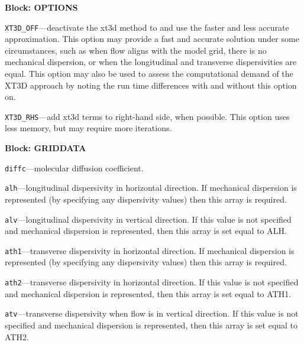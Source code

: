 
\item \textbf{Block: OPTIONS}

\begin{description}
\item \texttt{XT3D\_OFF}---deactivate the xt3d method to and use the faster and less accurate approximation.  This option may provide a fast and accurate solution under some circumstances, such as when flow aligns with the model grid, there is no mechanical dispersion, or when the longitudinal and transverse dispersivities are equal.  This option may also be used to assess the computational demand of the XT3D approach by noting the run time differences with and without this option on.

\item \texttt{XT3D\_RHS}---add xt3d terms to right-hand side, when possible.  This option uses less memory, but may require more iterations.

\end{description}
\item \textbf{Block: GRIDDATA}

\begin{description}
\item \texttt{diffc}---molecular diffusion coefficient.

\item \texttt{alh}---longitudinal dispersivity in horizontal direction.  If mechanical dispersion is represented (by specifying any dispersivity values) then this array is required.

\item \texttt{alv}---longitudinal dispersivity in vertical direction.  If this value is not specified and mechanical dispersion is represented, then this array is set equal to ALH.

\item \texttt{ath1}---transverse dispersivity in horizontal direction.  If mechanical dispersion is represented (by specifying any dispersivity values) then this array is required.

\item \texttt{ath2}---transverse dispersivity in horizontal direction.  If this value is not specified and mechanical dispersion is represented, then this array is set equal to ATH1.

\item \texttt{atv}---transverse dispersivity when flow is in vertical direction.  If this value is not specified and mechanical dispersion is represented, then this array is set equal to ATH2.

\end{description}

